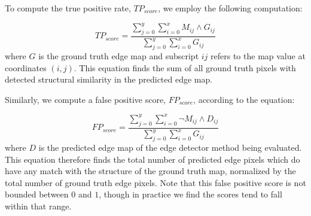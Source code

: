 \documentclass[conference]{IEEEtran}
\begin{document}
To compute the true positive rate, $TP_{score}$, we employ the following computation:

\begin{equation}
    \label{eq:truePositive}
     TP_{score}= \dfrac{\sum_{j=0}^{y}  \sum_{i=0}^{x} M_{ij} \land G_{ij}}{\sum_{j=0}^{y}  \sum_{i=0}^{x} G_{ij}}
\end{equation}
where $G$ is the ground truth edge map and subscript $ij$ refers to the map value at coordinates $(i,j)$. This equation finds the sum of all ground truth pixels with detected structural similarity in the predicted edge map.

Similarly, we compute a false positive score, $FP_{score}$, according to the equation:

\begin{equation}
    \label{eq:falsePositive}
     FP_{score}= \dfrac{\sum_{j=0}^{y}  \sum_{i=0}^{x} \neg M_{ij} \land D_{ij}}{\sum_{j=0}^{y}  \sum_{i=0}^{x} G_{ij}}
\end{equation}
where $D$ is the predicted edge map of the edge detector method being evaluated. This equation therefore finds the total number of predicted edge pixels which do have any match with the structure of the ground truth map, normalized by the total number of ground truth edge pixels. Note that this false positive score is not bounded between $0$ and $1$, though in practice we find the scores tend to fall within that range.
\end{document}
